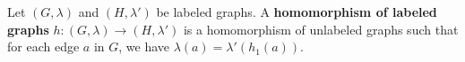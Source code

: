 \begin{definition}
    \label{def:graph:homomorphism}
    Let \( (G,\lambda) \) and \( (H,\lambda') \) be labeled graphs. A \textbf{homomorphism of labeled graphs} $h:(G,\lambda) \mathop{\rightarrow} (H,\lambda')$ is a homomorphism of unlabeled graphs such that for each edge \( a \) in \( G \), we have \( \lambda (a) \mathop{=} \lambda' (h_1 (a)) \).
\end{definition}